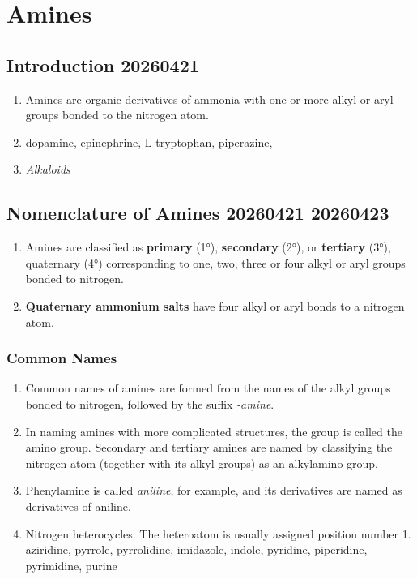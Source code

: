 \section{Amines}

\subsection{Introduction 20260421}

\begin{enumerate}
    \item Amines are organic derivatives of ammonia with one or more alkyl or aryl groups bonded to the nitrogen atom.
    \item dopamine, %
    epinephrine, %
    L-tryptophan, %
    piperazine, %
    \item \textit{Alkaloids}
\end{enumerate}

\subsection{Nomenclature of Amines 20260421 20260423}

\begin{enumerate}
    \item Amines are classified as \textbf{primary} (1°), \textbf{secondary} (2°), or \textbf{tertiary} (3°), quaternary (4°) corresponding to one, two, three or four alkyl or aryl groups bonded to nitrogen.
    \item \textbf{Quaternary ammonium salts} have four alkyl or aryl bonds to a nitrogen atom.
\end{enumerate}

\subsubsection{Common Names}

\begin{enumerate}
    \item Common names of amines are formed from the names of the alkyl groups bonded to nitrogen, followed by the suffix \textit{-amine}.
    \item In naming amines with more complicated structures, the  group is called the amino group. Secondary and tertiary amines are named by classifying the nitrogen atom (together with its alkyl groups) as an alkylamino group.
    \item Phenylamine is called \textit{aniline}, for example, and its derivatives are named as derivatives of aniline.
    \item Nitrogen heterocycles. The heteroatom is usually assigned position number 1. aziridine, pyrrole, pyrrolidine, imidazole, indole, pyridine, piperidine, pyrimidine, purine%
\end{enumerate}

